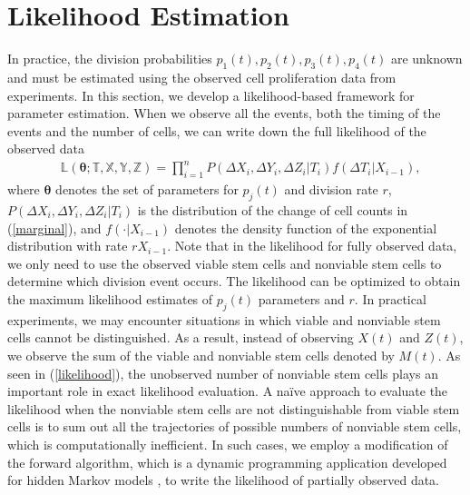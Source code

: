 \documentclass[pdflatex,sn-mathphys-num]{sn-jnl}
\theoremstyle{thmstyleone}%
\theoremstyle{thmstyletwo}%
\theoremstyle{thmstylethree}%
\newcommand{\LL}{\mathbb{L}}
\begin{document}
\section{Likelihood Estimation} \label{mle}
In practice, the division probabilities $p_1(t), p_2(t), p_3(t), p_4(t)$ are unknown and must be estimated using the observed cell proliferation data from experiments. In this section, we
 develop a likelihood-based framework for parameter estimation. When we observe all the events, both the timing of the events and the number of cells, we can write down the full likelihood of the observed data
\begin{equation} \label{likelihood}
    \begin{split}
        & \LL(\boldsymbol{\theta}; \mathbb{T},\mathbb{X},  \mathbb{Y},\mathbb{Z}) = \prod_{i=1}^n P(\Delta X_i, \Delta Y_i, \Delta Z_i \vert T_i) f(\Delta T_i\vert X_{i-1}),
    \end{split}
\end{equation}
where $\boldsymbol{\theta}$ denotes the set of parameters for $p_j(t)$ and division rate $r$, $P(\Delta X_i, \Delta Y_i, \Delta Z_i \vert T_i)$ is the distribution of the change of cell counts in (\ref{marginal}), and $f(\cdot\vert  X_{i-1})$ denotes the density function of the exponential distribution with rate $rX_{i-1}$. Note that in the likelihood for fully observed data, we only need to use the observed viable stem cells and nonviable stem cells to determine which division event occurs. The likelihood can be optimized to obtain the maximum likelihood estimates of $p_j(t)$ parameters and $r$. In practical experiments, we may encounter situations in which viable and nonviable stem cells cannot be distinguished. As a result, instead of observing $X(t)$ and $Z(t)$, we observe the sum of the viable and nonviable stem cells denoted by $M(t)$. As seen in (\ref{likelihood}), the unobserved number of nonviable stem cells plays an important role in exact likelihood evaluation. A na\"ive approach to evaluate the likelihood when the nonviable stem cells are not distinguishable from viable stem cells is to sum out all the trajectories of possible numbers of nonviable stem cells, which is computationally inefficient. In such cases, we employ a modification of the forward algorithm, which is a dynamic programming application developed for hidden Markov models  \cite{rabiner2002tutorial}, to write the likelihood of partially observed data.
\end{document}
